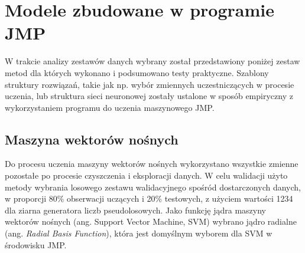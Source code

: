 \section{Modele zbudowane w programie JMP}

W trakcie analizy zestawów danych wybrany został przedstawiony poniżej zestaw metod dla których wykonano i podsumowano testy praktyczne. Szablony struktury rozwiązań, takie jak np. wybór zmiennych uczestniczących w procesie uczenia, lub struktura sieci neuronowej zostały ustalone w sposób empiryczny z wykorzystaniem programu do uczenia maszynowego JMP. 




\subsection{Maszyna wektorów nośnych}



Do procesu uczenia maszyny wektorów nośnych wykorzystano wszystkie zmienne pozostałe po procesie czyszczenia i eksploracji danych. W celu walidacji użyto metody wybrania losowego zestawu walidacyjnego spośród dostarczonych danych, w proporcji 80\% obserwacji uczących i 20\% testowych, z użyciem wartości 1234 dla ziarna generatora liczb pseudolosowych. Jako funkcję jądra maszyny wektorów nośnych (ang. Support Vector Machine, SVM) wybrano jądro radialne (ang. \textit{Radial Basis Function}), która jest domyślnym wyborem dla SVM w środowisku JMP. 

